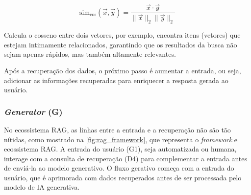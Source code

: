 \documentclass[a4paper, 12pt]{article}
\begin{document}
\begin{enumerate}
        \begin{equation}
            \text{sim}_{\cos}(\vec{x}, \vec{y}) = \frac{\vec{x} \cdot \vec{y}}{\|\vec{x}\|_2 \|\vec{y}\|_2}
            \label{eq:cosseno}
        \end{equation}
        
        Calcula o cosseno entre dois vetores, por exemplo, encontra itens (vetores) que estejam intimamente relacionados, garantindo que os resultados da busca não sejam apenas rápidos, mas também altamente relevantes.
    \end{enumerate}

    Após a recuperação dos dados, o próximo passo é aumentar a entrada, ou seja, adicionar as informações recuperadas para enriquecer a resposta gerada ao usuário.

    \subsubsection{\textit{Generator} (G)}

    No ecossistema RAG, as linhas entre a entrada e a recuperação não são tão nítidas, como mostrado na \autoref{fig:rag_framework}, que representa o \textit{framework} e ecossistema RAG. A entrada do usuário (G1), seja automatizada ou humana, interage com a consulta de recuperação (D4) para complementar a entrada antes de enviá-la ao modelo generativo. O fluxo gerativo começa com a entrada do usuário, que é aprimorada com dados recuperados antes de ser processada pelo modelo de IA generativa.
\end{document}
